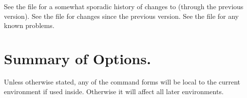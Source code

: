 \documentclass[letterpaper]{article}
\begin{document}
See the file  for a somewhat sporadic history of
changes to \mfp{} (through the previous version). See the file
 for changes since the previous version. See the file
 for any known problems.

\section{Summary of Options.}\label{summary}

Unless otherwise stated, any of the command forms will be local to the
current  environment if used inside. Otherwise it will affect
all later environments.

\medskip
\def\stack#1{{\tabular[t]{@{}l@{}}#1\endtabular}}
\end{document}
